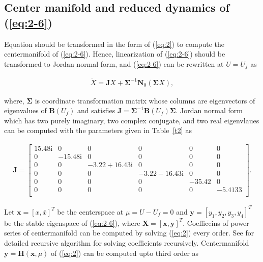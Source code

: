 \documentclass[openacc]{rsproca_new}%
\def\vec#1{\ensuremath{\mathbf{#1}}}
\newcommand{\Eref}[1]{(\ref{#1})}
\newcommand{\Tref}[1]{Table~\ref{#1}}
\begin{document}
\begin{appendices}
\gdef\thesection{Appendix \Alph{section}}

\section{Center manifold and reduced dynamics of \Eref{eq:2-6}} \label{ap1}
Equation should be transformed in the form of \Eref{eq:2} to compute the centermanifold of \Eref{eq:2-6}. Hence, linearization of \Eref{eq:2-6} should be transformed to Jordan normal form, and \Eref{eq:2-6} can be rewritten at $U=U_f$ as

\begin{align} \label{A1}
\dot X=\vec{J}X+\vec{\Sigma}^{-1} \vec{N}_0(\vec{\Sigma} X),
\end{align}

\noindent where, $\vec{\Sigma}$ is coordinate transformation matrix whose columns are eigenvectors of eigenvalues of $\vec{B}(U_f)$ and satisfies $\vec{J}=\vec{\Sigma}^{-1}\vec{B}(U_f)\vec{\Sigma}$. Jordan normal form which has two purely imaginary, two complex conjugate, and two real eigenvlaues can be computed with the parameters given in \Tref{t2} as

\begin{align}
\vec{J}=
\begin{bmatrix}
   15.48 \textrm{i}       & 0 & 0 & 0 & 0 & 0 \\
    0       & -15.48 \textrm{i} & 0 & 0 & 0 & 0 \\
    0       & 0 & -3.22+16.43\textrm{i} & 0 & 0 & 0\\
    0       & 0 & 0 & -3.22-16.43\textrm{i} & 0 & 0\\
    0       & 0 & 0 & 0 & -35.42 & 0\\
    0       & 0 & 0 & 0 & 0 & -5.4133\\
\end{bmatrix}.
\end{align}

\noindent Let $\vec{x}=[x,\bar x]^T$ be the centerspace at $\mu=U-U_f=0$ and $\vec y=[y_1,y_2,y_3,y_4]^T$ be the stable eigenspace of \Eref{eq:2-6}, where $\vec{X}=[\vec{x},\vec{y}]^T$. Coefficeins of power series of centermanifold can be computed by solving \Eref{eq:2} every order. See \cite{bi1999symbolic} for detailed recursive algorithm for solving coefficients recursively. Centermanifold $\vec y=\vec H(\vec x,\mu)$ of \Eref{eq:2} can be computed upto third order as



\end{appendices}
\end{document}
